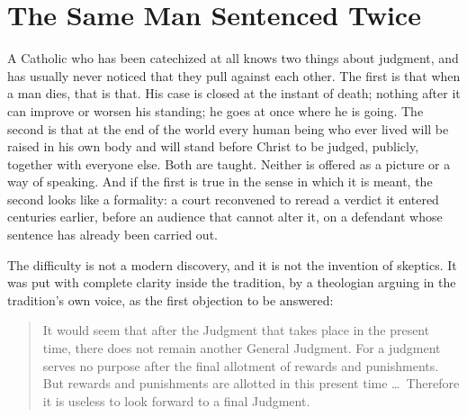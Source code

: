 \section{The Same Man Sentenced Twice}\label{sec:twice}

A Catholic who has been catechized at all knows two things about judgment, and has usually never noticed that they pull against each other. The first is that when a man dies, that is that. His case is closed at the instant of death; nothing after it can improve or worsen his standing; he goes at once where he is going. The second is that at the end of the world every human being who ever lived will be raised in his own body and will stand before Christ to be judged, publicly, together with everyone else. Both are taught. Neither is offered as a picture or a way of speaking. And if the first is true in the sense in which it is meant, the second looks like a formality: a court reconvened to reread a verdict it entered centuries earlier, before an audience that cannot alter it, on a defendant whose sentence has already been carried out.

The difficulty is not a modern discovery, and it is not the invention of skeptics. It was put with complete clarity inside the tradition, by a theologian arguing in the tradition's own voice, as the first objection to be answered:

\begin{quote}
It would seem that after the Judgment that takes place in the present time, there does not remain another General Judgment. For a judgment serves no purpose after the final allotment of rewards and punishments. But rewards and punishments are allotted in this present time \ldots\ Therefore it is useless to look forward to a final Judgment.
\end{quote}

